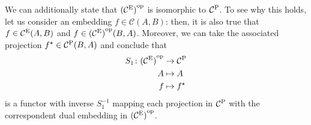 We can additionally state that \({(\mathcal{C}^\textup{E})}^\textup{op}\) is isomorphic to \(\mathcal{C}^\textup{P}\).
To see why this holds, let us consider an embedding \(f \in \mathcal{C}(A,B)\): then, it is also true that \(f \in \mathcal{C}^\textup{E}(A,B)\) and \(f \in {(\mathcal{C}^\textup{E})}^\textup{op}(B,A)\).
Moreover, we can take the associated projection \(f^\star \in \mathcal{C}^\textup{P}(B,A)\) and conclude that
\begin{equation*}
  \begin{split}
    S_{1} \colon {(\mathcal{C}^\textup{E})}^\textup{op} &\to \mathcal{C}^\textup{P} \\
    A &\mapsto A \\ f &\mapsto f^\star
  \end{split}
\end{equation*}
is a functor with inverse \(S_{1}^{-1}\) mapping each projection in \(\mathcal{C}^\textup{P}\) with the correspondent dual embedding in \({(\mathcal{C}^\textup{E})}^\textup{op}\).

